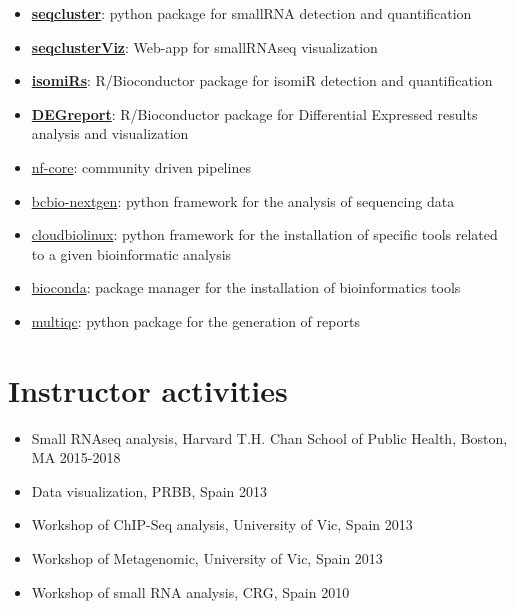 \begin{itemize}
\tightlist
\item
  \href{http://github.com/lpantano/seqcluster}{\textbf{seqcluster}}:
  python package for smallRNA detection and quantification
\item
  \href{http://github.com/lpantano/seqclusterViz}{\textbf{seqclusterViz}}:
  Web-app for smallRNAseq visualization
\item
  \href{http://github.com/lpantano/isomiRs}{\textbf{isomiRs}}:
  R/Bioconductor package for isomiR detection and quantification
\item
  \href{http://github.com/lpantano/DEGreport}{\textbf{DEGreport}}:
  R/Bioconductor package for Differential Expressed results analysis
  and visualization
\item 
  \href{https://nf-co.re/}{nf-core}: community driven pipelines
\item
  \href{http://github.com/chapmanb/bcbio-nextgen}{bcbio-nextgen}:
  python framework for the analysis of sequencing data
\item
  \href{http://github.com/chapmanb/cloudbiolinux}{cloudbiolinux}:
  python framework for the installation of specific tools related to
  a given bioinformatic analysis
\item
  \href{https://github.com/bioconda/bioconda-recipes}{bioconda}:
  package manager for the installation of bioinformatics tools
\item
  \href{https://github.com/ewels/MultiQC}{multiqc}: python package
  for the generation of reports
\end{itemize}

\hypertarget{instructor-activities}{%
\section{Instructor activities}\label{instructor-activities}}

\begin{itemize}
\tightlist
\item
  Small RNAseq analysis, Harvard T.H. Chan School of Public Health, Boston, MA \hfill 2015-2018
\item
  Data visualization, PRBB, Spain \hfill 2013
\item
  Workshop of ChIP-Seq analysis, University of Vic, Spain \hfill 2013
\item
  Workshop of Metagenomic, University of Vic, Spain \hfill 2013
\item
  Workshop of small RNA analysis, CRG, Spain \hfill 2010
\end{itemize}

